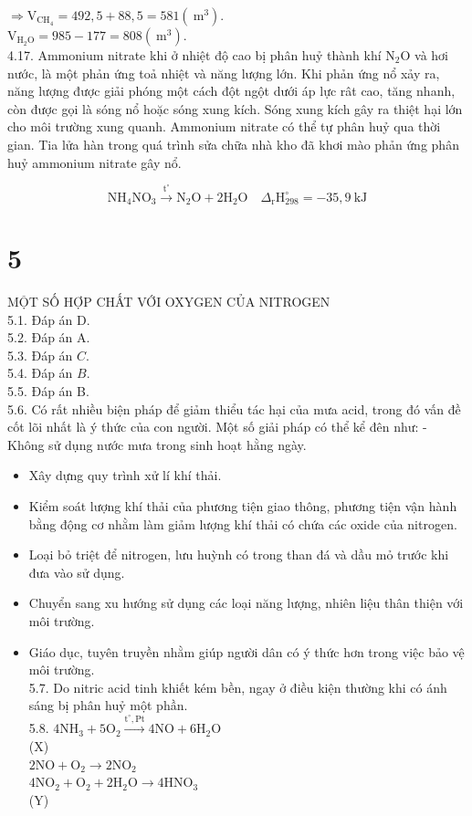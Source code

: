 \documentclass[10pt]{article}
\begin{document}
$\Rightarrow \mathrm{V}_{\mathrm{CH}_{4}}=492,5+88,5=581\left(\mathrm{~m}^{3}\right)$.\\
$\mathrm{V}_{\mathrm{H}_{2} \mathrm{O}}=985-177=808\left(\mathrm{~m}^{3}\right)$.\\
4.17. Ammonium nitrate khi ở nhiệt độ cao bị phân huỷ thành khí $\mathrm{N}_{2} \mathrm{O}$ và hơi nước, là một phản ứng toả nhiệt và năng lượng lớn. Khi phản ứng nổ xảy ra, năng lượng được giải phóng một cách đột ngột dưới áp lực rât cao, tăng nhanh, còn được gọi là sóng nổ hoặc sóng xung kích. Sóng xung kích gây ra thiệt hại lớn cho môi trường xung quanh. Ammonium nitrate có thể tự phân huỷ qua thời gian. Tia lửa hàn trong quá trình sửa chữa nhà kho đã khơi mào phản ứng phân huỷ ammonium nitrate gây nổ.

$$
\mathrm{NH}_{4} \mathrm{NO}_{3} \xrightarrow{\mathrm{t}^{\circ}} \mathrm{N}_{2} \mathrm{O}+2 \mathrm{H}_{2} \mathrm{O} \quad \Delta_{\mathrm{r}} \mathrm{H}_{298}^{\circ}=-35,9 \mathrm{~kJ}
$$

\section*{5}
MỘT SỐ HỢP CHẤT VỚI OXYGEN CỦA NITROGEN\\
5.1. Đáp án D.\\
5.2. Đáp án A.\\
5.3. Đáp án $C$.\\
5.4. Đáp án $B$.\\
5.5. Đáp án B.\\
5.6. Có rất nhiều biện pháp để giảm thiểu tác hại của mưa acid, trong đó vấn đề cốt lõi nhất là ý thức của con người. Một số giải pháp có thể kể đên như: - Không sử dụng nước mưa trong sinh hoạt hằng ngày.

\begin{itemize}
  \item Xây dựng quy trình xử lí khí thải.
  \item Kiểm soát lượng khí thải của phương tiện giao thông, phương tiện vận hành bằng động cơ nhằm làm giảm lượng khí thải có chứa các oxide của nitrogen.
  \item Loại bỏ triệt để nitrogen, lưu huỳnh có trong than đá và dầu mỏ trước khi đưa vào sử dụng.
  \item Chuyển sang xu hướng sử dụng các loại năng lượng, nhiên liệu thân thiện với môi trường.
  \item Giáo dục, tuyên truyền nhằm giúp người dân có ý thức hơn trong việc bảo vệ môi trường.\\
5.7. Do nitric acid tinh khiết kém bền, ngay ở điều kiện thường khi có ánh sáng bị phân huỷ một phần.\\
5.8. $4 \mathrm{NH}_{3}+5 \mathrm{O}_{2} \xrightarrow{\mathrm{t}^{\circ}, \mathrm{Pt}} 4 \mathrm{NO}+6 \mathrm{H}_{2} \mathrm{O}$\\
(X)\\
$2 \mathrm{NO}+\mathrm{O}_{2} \rightarrow 2 \mathrm{NO}_{2}$\\
$4 \mathrm{NO}_{2}+\mathrm{O}_{2}+2 \mathrm{H}_{2} \mathrm{O} \rightarrow 4 \mathrm{HNO}_{3}$\\
(Y)
\end{itemize}
\end{document}
